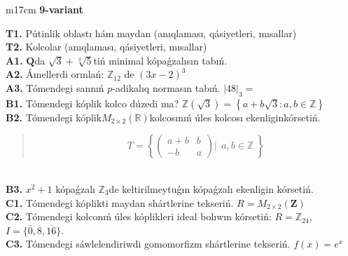 \documentclass{article}
\begin{document}
\begin{tabular}{m{17cm}}
\textbf{9-variant}
\newline

\textbf{T1.} Pútinlik oblastı hám maydan (anıqlaması, qásiyetleri, mısallar) \\
\textbf{T2.} Kolcolar (anıqlaması, qásiyetleri, mısallar) \\
\textbf{A1.} \(\mathbf{Q}\)da \(\sqrt{3} + \sqrt[3]{5}\)tiń minimal kópaǵzalısın tabıń. \\
\textbf{A2.} Ámellerdi orınlań: \(\mathbb{Z}_{12}\) de \((3x - 2)^{3}\) \\
\textbf{A3.} Tómendegi sannıń \(p\)-adikalıq normasın tabıń. \(|48|_{3} =\) \\
\textbf{B1.} Tómendegi kóplik kolco dúzedi ma? \(\mathbb{Z}\left( \sqrt{3} \right) = \left\{ a + b\sqrt{3}:a,b \in \mathbb{Z} \right\}\) \\
\textbf{B2.} Tómendegi kóplik\(M_{2 \times 2}\left( \mathbb{R} \right)\)kolcosınıń úles kolcosı ekenliginkórsetiń.
\begin{quote}
\[T = \left\{ \begin{pmatrix}
a + b & b \\
 - b & a
\end{pmatrix}\left| \ \ a,b\mathbb{\in Z} \right.\  \right\}\]
\end{quote} \\
\textbf{B3.} \(x^{2} + 1\) kópaǵzalı \(\mathbb{Z}_{3}\)de keltirilmeytuǵın kópaǵzalı ekenligin kórsetiń. \\
\textbf{C1.} Tómendegi kóplikti maydan shártlerine tekseriń. \(R = M_{2 \times 2}\left( \mathbf{Z} \right)\) \\
\textbf{C2.} Tómendegi kolconıń úles kóplikleri ideal bolıwın kórsetiń:
\(R = \mathbb{Z}_{24}\), \(I = \{\overline{0},\overline{8},\overline{16}\}\). \\
\textbf{C3.} Tómendegi sáwlelendiriwdi gomomorfizm shártlerine tekseriń. \(f(x) = e^{x}\) \\

\end{tabular}
\vspace{1cm}
\end{document}
